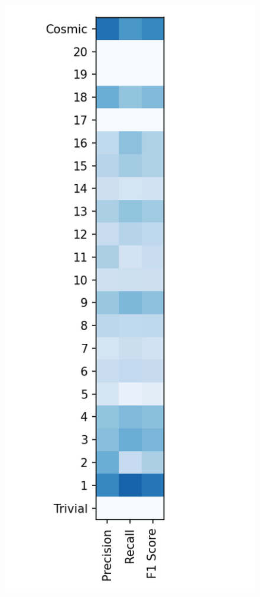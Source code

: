 \documentclass{article}
\begin{document}
	\begin{figure}[ht]
		\begin{minipage}[b]{0.32\linewidth}
			\centering
			\includegraphics[width=\linewidth]{22 - AdaBoost.png} 

\end{minipage}
\end{figure}
\end{document}
